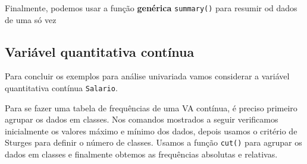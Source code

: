 \documentclass[10pt,a4paper]{book}
\newenvironment{Shaded}{\begin{snugshade}}{\end{snugshade}}
\newcommand{\KeywordTok}[1]{\textcolor[rgb]{0.13,0.29,0.53}{\textbf{#1}}}
\newcommand{\StringTok}[1]{\textcolor[rgb]{0.31,0.60,0.02}{#1}}
\newcommand{\OperatorTok}[1]{\textcolor[rgb]{0.81,0.36,0.00}{\textbf{#1}}}
\newcommand{\NormalTok}[1]{#1}
\begin{document}
Finalmente, podemos usar a função \textbf{genérica} \texttt{summary()}
para resumir od dados de uma só vez

\begin{Shaded}
\end{Shaded}

\subsection{Variável quantitativa
contínua}\label{variavel-quantitativa-continua}

Para concluir os exemplos para análise univariada vamos considerar a
variável quantitativa contínua \texttt{Salario}.

Para se fazer uma tabela de frequências de uma VA contínua, é preciso
primeiro agrupar os dados em classes. Nos comandos mostrados a seguir
verificamos inicialmente os valores máximo e mínimo dos dados, depois
usamos o critério de Sturges para definir o número de classes. Usamos a
função \texttt{cut()} para agrupar os dados em classes e finalmente
obtemos as frequências absolutas e relativas.
\end{document}
